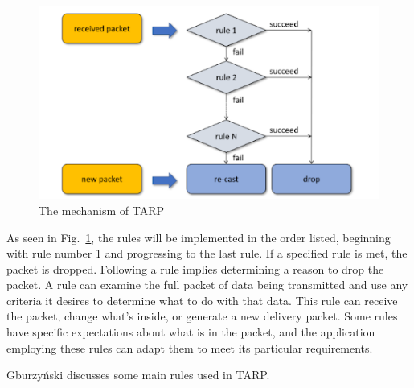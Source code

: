 \documentclass[12pt, conference, onecolumn, a4paper]{IEEEtran}
\begin{document}
\begin{figure}[htbp]
    \centerline{\includegraphics[height=0.45\textwidth]{imgs/tarpproc.png}}
    \caption{The mechanism of TARP \cite{wsn2021}}
    \label{tarpproc}
\end{figure}

As seen in Fig.~\ref{tarpproc}, the rules will be implemented in the order
listed, beginning with rule number 1 and progressing to the last rule. If a
specified rule is met, the packet is dropped. Following a rule implies
determining a reason to drop the packet. A rule can examine the full packet of
data being transmitted and use any criteria it desires to determine what to do
with that data. This rule can receive the packet, change what's inside, or
generate a new delivery packet. Some rules have specific expectations about
what is in the packet, and the application employing these rules can adapt them
to meet its particular requirements\cite{wsn2021}.

Gburzyński\cite{wsn2021} discusses some main rules used in TARP.
\end{document}
